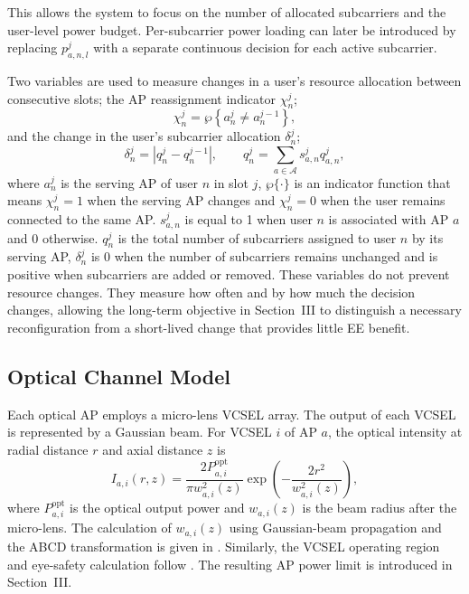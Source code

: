 \documentclass[journal]{IEEEtran}
\begin{document}
This allows the system to focus on the number of allocated subcarriers and the user-level power budget. Per-subcarrier power loading can later be introduced by replacing $p_{a,n,l}^{j}$ with a separate continuous decision for each active subcarrier.

Two variables are used to measure changes in a user's resource
allocation between consecutive slots; the AP reassignment indicator $\chi_{n}^{j}$; 
\begin{equation}
    \chi_{n}^{j}
    =
    {\wp} \!\left\{a_{n}^{j}\neq a_{n}^{j-1}\right\},
    \label{eq:handover_indicator}
\end{equation}
and the change in the user's subcarrier allocation $\delta_{n}^{j}$;
\begin{equation}
    \delta_{n}^{j}
    =
    \left|q_{n}^{j}-q_{n}^{j-1}\right|,
    \qquad
    q_{n}^{j}
    =
    \sum_{a\in\mathcal{A}}
    s_{a,n}^{j}q_{a,n}^{j},
    \label{eq:subcarrier_reconfiguration}
\end{equation}
where $a_n^j$ is the serving AP of user $n$ in slot $j$, ${\wp}\{\cdot\}$ is an indicator function that means $\chi_n^j=1$ when the serving AP changes and $\chi_n^j=0$
when the user remains connected to the same AP. $s_{a,n}^{j}$ is equal to 1 when user $n$ is associated
with AP $a$ and 0 otherwise. $q_n^j$ is the total number of subcarriers assigned to user $n$ by its serving AP, $\delta_n^j$ is 0 when the number of subcarriers remains
unchanged and is positive when subcarriers are added or removed. These variables do not prevent resource changes. They measure how often and by how much the decision changes, allowing the long-term objective in Section~III to distinguish a necessary reconfiguration from a short-lived change that provides little EE benefit.

\subsection{Optical Channel Model}

Each optical AP employs a micro-lens VCSEL array\cite{Ncube2022EE,Ncube2024Cells}. The output of each VCSEL is represented by a Gaussian beam. For VCSEL $i$ of AP $a$, the optical intensity at radial distance $r$ and axial distance $z$ is \cite{Ncube2022EE,Ncube2024Cells,Soltani2022Safety}
\begin{equation}
    I_{a,i}(r,z)
    =
    \frac{2P_{a,i}^{\mathrm{opt}}}
    {\pi w_{a,i}^{2}(z)}
    \exp\!\left(
    -\frac{2r^{2}}{w_{a,i}^{2}(z)}
    \right),
    \label{eq:gaussian_intensity}
\end{equation}
where $P_{a,i}^{\mathrm{opt}}$ is the optical output power and $w_{a,i}(z)$ is the beam radius after the micro-lens. The calculation of $w_{a,i}(z)$ using Gaussian-beam propagation and the ABCD transformation is given in \cite{Ncube2022EE,Ncube2024Cells}. Similarly, the VCSEL operating region and eye-safety calculation follow \cite{Soltani2022Safety}. The resulting AP power limit is introduced in Section~III.
\end{document}
